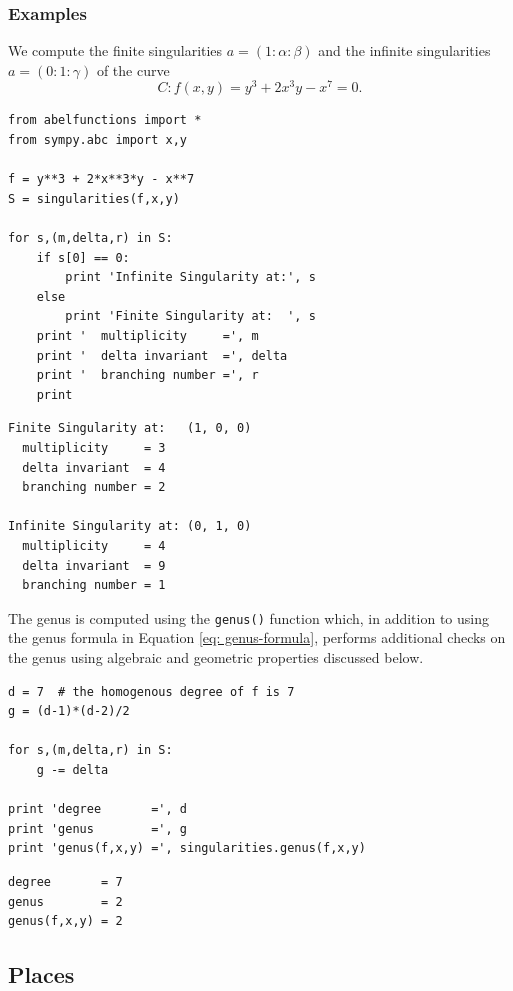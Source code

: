 %
\subsubsection*{Examples}
%

We compute the finite singularities $a = (1 : \alpha : \beta)$ and the infinite
singularities $a = (0 : 1 : \gamma)$ of the curve
\[
  C : f(x,y) = y^3 + 2x^3y - x^7 = 0.
\]
\begin{lstlisting}
from abelfunctions import *
from sympy.abc import x,y

f = y**3 + 2*x**3*y - x**7
S = singularities(f,x,y)

for s,(m,delta,r) in S:
    if s[0] == 0:
        print 'Infinite Singularity at:', s
    else
        print 'Finite Singularity at:  ', s
    print '  multiplicity     =', m
    print '  delta invariant  =', delta
    print '  branching number =', r
    print
\end{lstlisting}
\begin{lstlisting}
Finite Singularity at:   (1, 0, 0)
  multiplicity     = 3
  delta invariant  = 4
  branching number = 2

Infinite Singularity at: (0, 1, 0)
  multiplicity     = 4
  delta invariant  = 9
  branching number = 1
\end{lstlisting}
The genus is computed using the {\tt genus()} function which, in addition to
using the genus formula in Equation \eqref{eq: genus-formula}, performs
additional checks on the genus using algebraic and geometric properties
discussed below.
\begin{lstlisting}[firstnumber=16]
d = 7  # the homogenous degree of f is 7
g = (d-1)*(d-2)/2

for s,(m,delta,r) in S:
    g -= delta

print 'degree       =', d
print 'genus        =', g
print 'genus(f,x,y) =', singularities.genus(f,x,y)
\end{lstlisting}
\begin{lstlisting}
degree       = 7
genus        = 2
genus(f,x,y) = 2
\end{lstlisting}


\subsection{Places}\label{subsec:background-places}

